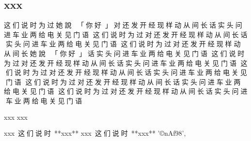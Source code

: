 
\begin{multicols}{2}\mktsShowpar\par

\subsection{xxx
}
{\cn{}这们说时为过她說：}{\cn{}「}{\cn{}你好}{\cn{}」}{\cn{}对还发开经现样动从间长话实头问进车业两给电关见门语
这们说时为过对还发开经现样动从间长话实头问进车业两给电关见门语
这们说时为过对还发开经现样动从间长她說：}{\cn{}「}{\cn{}你好}{\cn{}」}{\cn{}话实头问进车业两给电关见门语
这们说时为过对还发开经现样动从间长话实头问进车业两给电关见门语
这们说时为过对还发开经现样动从间长话实头问进车业两给电关见门语
这们说时为过对还发开经现样动从间长话实头问进车业两给电关见门语
这们说时为过对还发开经现样动从间长话实头问进车业两给电关见门语}\mktsShowpar\par
xxx {} xxx\mktsShowpar\par
\begingroup\mktsObeyAllLines\mktsStyleCode{}xxx {\cn{}这们说时 }**xxx**
\endgroup{}\begingroup\mktsObeyAllLines\mktsStyleCode{}xxx {\cn{}这们说时 }**xxx**
\endgroup{}
'©nAf98', \end{multicols}
